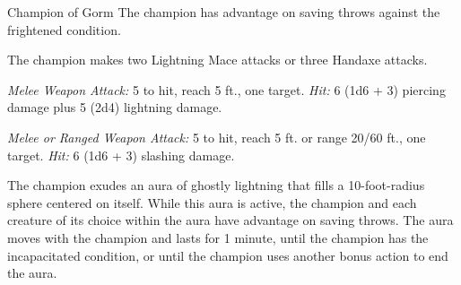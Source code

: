\documentclass[10pt,a4paper,twoside,bg=print,twocolumn,openany,nodeprecatedcode]{dndbook}
\begin{document}
\begin{DndMonster}[float=t]{Champion of Gorm}
\DndMonsterBasics[
armor-class = {19 (\textit{splint armor})},
hit-points = {\DndDice{6d8 + 6}},
speed = {30 ft.}
]
\DndMonsterAbilityScores[
 str = 17,
 dex = 10,
 con = 12,
 int = 12,
 wis = 15,
 cha = 16
]
\DndMonsterDetails[
saving-throws = {Str +5, Wis +4},
skills = {Athletics +5, Insight +4, Religion +3},
languages = {Common},
challenge = 2,
]
The champion has advantage on saving throws against the frightened condition.

The champion makes two Lightning Mace attacks or three Handaxe attacks.

\textsl{Melee Weapon Attack:} 5 to hit, reach 5 ft., one target. \textsl{Hit:} 6 (1d6 + 3) piercing damage plus 5 (2d4) lightning damage.

\textsl{Melee or Ranged Weapon Attack:} 5 to hit, reach 5 ft. or range 20/60 ft., one target. \textsl{Hit:} 6 (1d6 + 3) slashing damage.

The champion exudes an aura of ghostly lightning that fills a 10-foot-radius sphere centered on itself. While this aura is active, the champion and each creature of its choice within the aura have advantage on saving throws. The aura moves with the champion and lasts for 1 minute, until the champion has the incapacitated condition, or until the champion uses another bonus action to end the aura.

\end{DndMonster}
\end{document}
